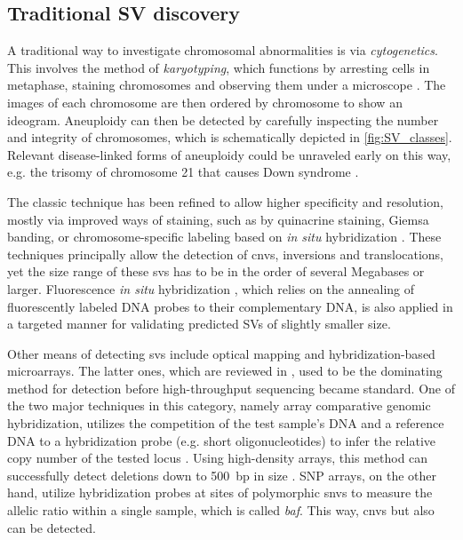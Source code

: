 \subsection{Traditional SV discovery}
\label{sec:sv_detection_old}

A traditional way to investigate chromosomal abnormalities is via \emph{cytogenetics}.
This involves the method of \emph{karyotyping}, which functions by arresting cells in
metaphase, staining chromosomes and observing them under a microscope
\citep{Speicher2005}. The images of each chromosome are then ordered by
chromosome to show an ideogram. Aneuploidy can then be detected by carefully
inspecting the number and integrity of chromosomes, which is
schematically depicted in \cref{fig:SV_classes}. Relevant
disease-linked forms of aneuploidy could be unraveled early on this way, e.g.
the trisomy of chromosome 21 that causes Down syndrome \citep{Lejeune1959}.

The classic technique has been
refined to allow higher specificity and resolution, mostly via improved ways of
staining, such as by quinacrine staining, Giemsa banding, or chromosome-specific
labeling based on \textit{in situ} hybridization \citep{Speicher2005}. These techniques
principally allow the detection of \acp{cnv}, inversions and translocations,
yet the size range of these \acp{sv} has to be in the order of several Megabases
or larger. Fluorescence \textit{in situ} hybridization \citep{Bauman1980}, which relies
on the annealing of fluorescently labeled DNA probes to their complementary DNA,
is also applied in a targeted manner for validating predicted SVs of slightly
smaller size.

Other means of detecting \acp{sv} include optical mapping
\citep{Schwartz1993,Teague2010} and hybridization-based microarrays. The latter
ones, which are reviewed in \citet{Alkan2011}, used to be the dominating method
for \cnv detection before high-throughput sequencing became standard. One of the
two major techniques in this category, namely array comparative genomic
hybridization, utilizes the competition of the test sample's DNA and a reference
DNA to a hybridization probe (e.g. short oligonucleotides) to infer the relative
copy number of the tested locus \citep{Snijders2001}. Using high-density arrays,
this method can successfully detect deletions down to 500~bp in size
\citep{Conrad2010}. SNP arrays, on the other hand, utilize hybridization probes
at sites of polymorphic \acp{snv} to measure the allelic ratio within a single
sample, which is called \emph{\acf{baf}}. This way, \acp{cnv} but also \loh can
be detected.





